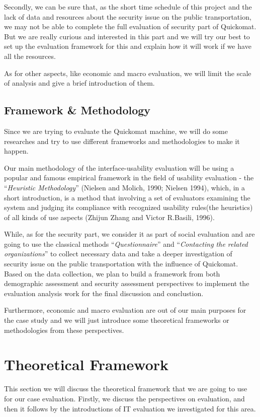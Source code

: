 \documentclass[twocolumn]{article}
\begin{document}
Secondly, we can be sure that, as the short time schedule of this project and the lack of data and resources about the security issue on the public transportation, we may not be able to complete the full evaluation of security part of Quickomat. But we are really curious and interested in this part and we will try our best to set up the evaluation framework for this and explain how it will work if we have all the resources. 

As for other aspects, like economic and  macro evaluation, we will limit the scale of analysis and give a brief introduction of them.

\subsection{Framework \& Methodology}
Since we are trying to evaluate the Quickomat machine, we will do some researches and try to use different frameworks and methodologies to make it happen.

Our main methodology of the interface-usability evaluation will be using a popular and famous empirical framework in the field of usability evaluation - the “\emph{Heuristic Methodology}” (Nielsen and Molich, 1990; Nielsen 1994), which, in a short introduction, is a method that involving a set of evaluators examining the system and judging its compliance with recognized usability rules(the heuristics) of all kinds of use aspects (Zhijun Zhang and Victor R.Basili, 1996). 

While, as for the security part, we consider it as part of social evaluation and are going to use the classical methods “\emph{Questionnaire}” and “\emph{Contacting the related organizations}” to collect necessary data and take a deeper investigation of security issue on the public transportation with the influence of Quickomat. Based on the data collection, we plan to build a framework from both demographic assessment and security assessment perspectives to implement the evaluation analysis work for the final discussion and conclustion. 

Furthermore, economic and macro evaluation are out of our main purposes for the case study and we will just introduce some theoretical frameworks or methodologies from these perspectives.

\section{Theoretical Framework}
This section we will discuss the theoretical framework that we are going to use for our case evaluation. Firstly, we discuss the perspectives on evaluation, and then it follows by the introductions of IT evaluation we investigated for this area.
\end{document}
